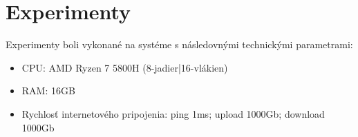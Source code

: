 \documentclass[10pt,xcolor=pdflatex,dvipsnames,table,oneside]{book}
\begin{document}

\chapter{Experimenty}
\par Experimenty boli vykonané na systéme s následovnými technickými parametrami:
\begin{itemize}
    \item CPU: AMD Ryzen 7 5800H (8-jadier|16-vlákien)
    \item RAM: 16GB
    \item Rychlosť internetového pripojenia:  ping 1ms; upload 1000Gb; download 1000Gb
\end{itemize}
\newline 
\end{document}
